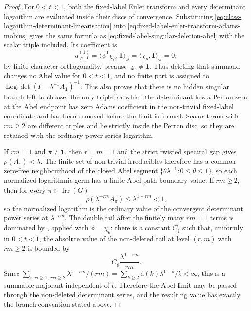 \documentclass[11pt,a4paper]{amsart}
\theoremstyle{plain}
\theoremstyle{definition}
\theoremstyle{remark}
\DeclareMathOperator{\Irr}{Irr}
\DeclareMathOperator{\Log}{Log}
\begin{document}
\begin{proof}
  For \(0<t<1\), both the fixed-label Euler transform and every determinant
  logarithm are evaluated inside their discs of convergence. Substituting
  \eqref{eq:class-logarithm-determinant-linearisation} into
  \eqref{eq:fixed-label-euler-transform-adams-mobius} gives the same
  formula as \eqref{eq:fixed-label-singular-deletion-abel} with the scalar
  triple included.  Its coefficient is
  \[
    a_{\varrho,\mathbf1}^{(1)}
    =\langle\psi^1\chi_\varrho,\mathbf1\rangle_G
    =\langle\chi_\varrho,\mathbf1\rangle_G=0,
  \]
  by finite-character orthogonality, because \(\varrho\neq\mathbf1\).
  Thus deleting that summand changes no Abel value for \(0<t<1\), and no
  finite part is assigned to
  \(\Log\det(I-\lambda^{-1}A_{\mathbf1})^{-1}\).
  This also proves that there is no hidden singular branch left to choose:
  the only triple for which the determinant has a Perron zero at the Abel
  endpoint has zero Adams coefficient in the non-trivial fixed-label
  coordinate and has been removed before the limit is formed.  Scalar terms
  with \(rm\ge2\) are different triples and lie strictly inside the Perron
  disc, so they are retained with the ordinary power-series logarithm.

  If \(rm=1\) and \(\pi\neq\mathbf1\), then \(r=m=1\) and the strict twisted
  spectral gap gives \(\rho(A_\pi)<\lambda\).  The finite set of non-trivial
  irreducibles therefore has a common zero-free neighbourhood of the closed
  Abel segment \(\{\theta\lambda^{-1}:0\le\theta\le1\}\), so each normalized
  logarithmic germ has a finite Abel-path boundary value. If \(rm\ge2\), then
  for every \(\pi\in\Irr(G)\),
  \[
    \rho(\lambda^{-rm}A_\pi)
    \le \lambda^{1-rm}<1,
  \]
  so the normalized logarithm is the ordinary value of the convergent
  determinant power series at \(\lambda^{-rm}\).  The double tail after the
  finitely many \(rm=1\) terms is dominated by
  , applied with
  \(\phi=\chi_\varrho\): there is a constant \(C_\varrho\) such that, uniformly
  in \(0<t<1\), the absolute value of the non-deleted tail at level \((r,m)\)
  with \(rm\ge2\) is bounded by
  \[
    C_\varrho\frac{\lambda^{1-rm}}{rm}.
  \]
  Since
  \(\sum_{r,m\ge1,\,rm\ge2}\lambda^{1-rm}/(rm)
    =\sum_{k\ge2}\mathrm d(k)\lambda^{1-k}/k<\infty\), this is a summable
  majorant independent of \(t\).  Therefore the Abel limit may be passed
  through the non-deleted determinant series, and the resulting value has
  exactly the branch convention stated above.
\end{proof}
\end{document}
